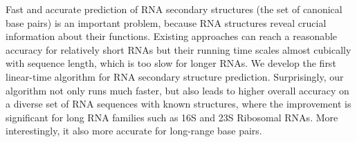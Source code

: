 Fast and accurate prediction of RNA secondary structures 
(the set of canonical base pairs)
is an important problem, 
because RNA structures reveal crucial information about their functions.
Existing approaches can reach a reasonable accuracy 
for relatively short RNAs %
but their running time scales almost cubically with sequence length,
which is too slow for longer RNAs.
We develop the first linear-time algorithm for RNA secondary structure prediction.
Surprisingly, our algorithm not only runs much faster,
but also leads to higher overall accuracy %
on a diverse set of RNA sequences with known structures,
where the improvement is significant for long RNA families such as
16S and 23S Ribosomal RNAs.
More interestingly, it also more accurate for long-range base pairs.







